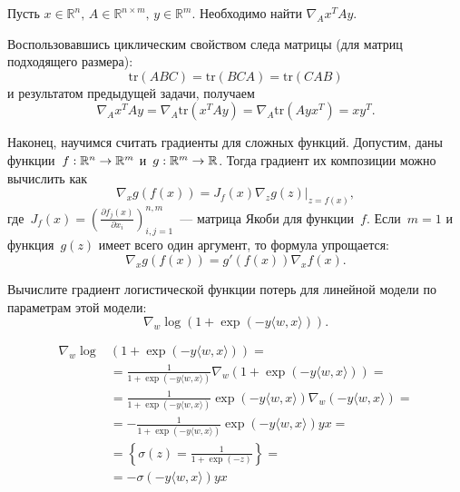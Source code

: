 \documentclass[12pt,fleqn]{article}
\begin{document}
\begin{vkProblem} Пусть $x \in \mathbb{R}^n, \, A \in \mathbb{R}^{n \times m}, \, y \in \mathbb{R}^m.$ Необходимо найти $\nabla_A x^TAy$. 
\end{vkProblem}

\begin{esSolution} Воспользовавшись циклическим свойством следа матрицы (для матриц подходящего размера): 
\[
\text{tr}(ABC) = \text{tr}(BCA) = \text{tr}(CAB)
\]
    и результатом предыдущей задачи, получаем
\[
\nabla_A x^TAy = \nabla_A \text{tr} (x^TAy) =  \nabla_A \text{tr}(Ayx^T) = xy^T.
\]
    
\end{esSolution}

Наконец, научимся считать градиенты для сложных функций.
Допустим, даны функции~$f: \mathbb{R}^n \to \mathbb{R}^m$ и~$g: \mathbb{R}^m \to \mathbb{R}$.
Тогда градиент их композиции можно вычислить как
\[
    \nabla_x g \left( f(x) \right)
    =
    J_{f} (x)
    \nabla_z \left. g(z) \right|_{z = f(x)},
\]
где~$J_f (x) = \left( \frac{\partial f_j(x)}{\partial x_i}  \right)_{i, j = 1}^{n, m}$~--- матрица Якоби для функции~$f$.
Если~$m = 1$ и функция~$g(z)$ имеет всего один аргумент, то формула упрощается:
\[
    \nabla_x g \left( f(x) \right)
    =
    g'(f(x))
    \nabla_x f(x).
\]

\begin{vkProblem}
    Вычислите градиент логистической функции потерь для линейной модели по параметрам этой модели:
    \[
        \nabla_w
        \log \left(
            1
            +
            \exp(-y \langle w, x \rangle)
        \right).
    \]
\end{vkProblem}

\begin{esSolution}
    \begin{align*}
        \nabla_w
        \log &\left(
            1
            +
            \exp(-y \langle w, x \rangle)
        \right)
        = \\
        &=
        \frac{
            1
        }{
            1
            +
            \exp(-y \langle w, x \rangle)
        }
        \nabla_w \left(
            1
            +
            \exp(-y \langle w, x \rangle)
        \right)
        =\\
        &=
        \frac{
            1
        }{
            1
            +
            \exp(-y \langle w, x \rangle)
        }
        \exp(-y \langle w, x \rangle)
        \nabla_w \left(
            -y \langle w, x \rangle
        \right)
        =\\
        &=
        -
        \frac{
            1
        }{
            1
            +
            \exp(-y \langle w, x \rangle)
        }
        \exp(-y \langle w, x \rangle)
        y
        x
        =\\
        &=
        \left\{
            \sigma(z)
            =
            \frac{
                1
            }{
                1 + \exp(-z)
            }
        \right\}
        =\\
        &=
        -
        \sigma(-y \langle w, x \rangle)
        y
        x
    \end{align*}
\end{esSolution}
\end{document}
